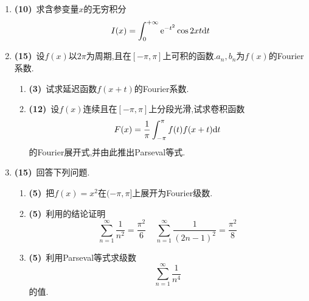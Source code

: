 \documentclass{ctexart}
\begin{document}
\begin{enumerate}[leftmargin=*,label=\textbf{\arabic*.},topsep=0pt,parsep=0pt,itemsep=0pt,partopsep=0pt]
\begin{enumerate}[label=\tbf{(\arabic*)},topsep=0pt,parsep=0pt,itemsep=0pt,partopsep=0pt]
        \end{enumerate}
    \item \textbf{(10)}\ 求含参变量$x$的无穷积分
        \[I(x)=\int_0^{+\infty}\mathrm{e}^{-t^2}\cos 2xt\mathrm{d} t\]
    \item \textbf{(15)}\ 设$f(x)$以$2\pi$为周期,且在$[-\pi,\pi]$上可积的函数.$a_n,b_n$为$f(x)$的Fourier系数.
        \begin{enumerate}[label=\tbf{(\arabic*)},topsep=0pt,parsep=0pt,itemsep=0pt,partopsep=0pt]
            \item \textbf{(3)}\ 试求延迟函数$f(x+t)$的Fourier系数.
            \item \textbf{(12)}\ 设$f(x)$连续且在$[-\pi,\pi]$上分段光滑,试求卷积函数
                \[F(x)=\dfrac{1}{\pi}\int_{-\pi}^{\pi}f(t)f(x+t)\mathrm{d} t\]
                的Fourier展开式,并由此推出Parseval等式.

        \end{enumerate}
    \item \textbf{(15)}\ 回答下列问题.
        \begin{enumerate}[label=\tbf{(\arabic*)},topsep=0pt,parsep=0pt,itemsep=0pt,partopsep=0pt]
            \item \textbf{(5)}\ 把$f(x)=x^2$在$(-\pi,\pi]$上展开为Fourier级数.
            \item \textbf{(5)}\ 利用的结论证明
                \[\sum_{n=1}^{\infty}\dfrac{1}{n^2}=\dfrac{\pi^2}{6}\ \ \ \ \ \sum_{n=1}^{\infty}\dfrac{1}{(2n-1)^2}=\dfrac{\pi^2}{8}\]
            \item \textbf{(5)}\ 利用Parseval等式求级数
                \[\sum_{n=1}^{\infty}\dfrac{1}{n^4}\]
                的值.
        \end{enumerate}
\end{enumerate}
\end{document}
